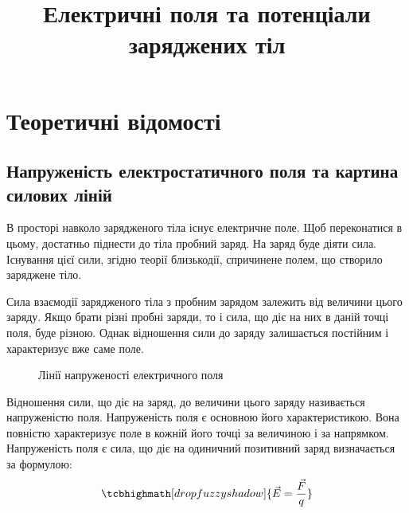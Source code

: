 \documentclass{LabWork}
\title{Електричні поля та потенціали\\ заряджених тіл}
\begin{document}
\writedatatofile{\jobname}
\maketitle

\section{Теоретичні відомості}

\subsection{Напруженість електростатичного поля та картина силових ліній}
В просторі навколо зарядженого тіла існує електричне поле. Щоб переконатися в цьому, достатньо піднести до тіла пробний заряд. На заряд буде діяти сила. Існування цієї сили, згідно теорії близькодії, спричинене полем, що створило заряджене тіло.

Сила взаємодії зарядженого тіла з пробним зарядом залежить від величини цього заряду. Якщо брати різні пробні заряди, то і сила, що діє на них в даній точці поля, буде різною. Однак відношення сили до заряду залишається постійним і характеризує вже саме поле.

\begin{wrapfigure}{O}{0.45\linewidth}\centering
{}
\caption{Лінії напруженості електричного поля}
\label{pic:Elines}
\end{wrapfigure}
Відношення сили, що діє на заряд, до величини цього заряду називається напруженістю поля. Напруженість
поля є основною його характеристикою. Вона повністю характеризує поле в кожній його точці за величиною і за напрямком. Напруженість поля є сила, що діє на одиничний позитивний заряд визначається за формулою:
\begin{equation}\label{key}
    \tcbhighmath[drop fuzzy shadow]{\vec{E} = \frac{\vec{F}}{q}}
\end{equation}
\end{document}
